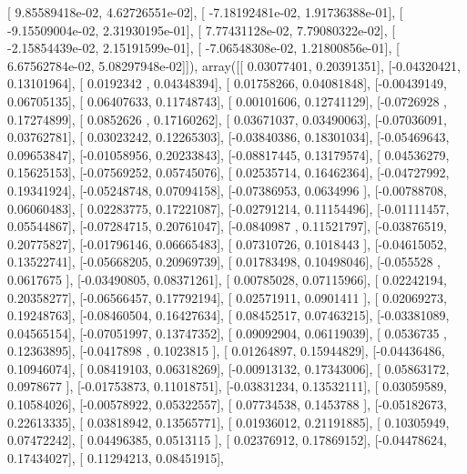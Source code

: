 \documentclass{article}
\begin{document}
       [  9.85589418e-02,   4.62726551e-02],
       [ -7.18192481e-02,   1.91736388e-01],
       [ -9.15509004e-02,   2.31930195e-01],
       [  7.77431128e-02,   7.79080322e-02],
       [ -2.15854439e-02,   2.15191599e-01],
       [ -7.06548308e-02,   1.21800856e-01],
       [  6.67562784e-02,   5.08297948e-02]]), array([[ 0.03077401,  0.20391351],
       [-0.04320421,  0.13101964],
       [ 0.0192342 ,  0.04348394],
       [ 0.01758266,  0.04081848],
       [-0.00439149,  0.06705135],
       [ 0.06407633,  0.11748743],
       [ 0.00101606,  0.12741129],
       [-0.0726928 ,  0.17274899],
       [ 0.0852626 ,  0.17160262],
       [ 0.03671037,  0.03490063],
       [-0.07036091,  0.03762781],
       [ 0.03023242,  0.12265303],
       [-0.03840386,  0.18301034],
       [-0.05469643,  0.09653847],
       [-0.01058956,  0.20233843],
       [-0.08817445,  0.13179574],
       [ 0.04536279,  0.15625153],
       [-0.07569252,  0.05745076],
       [ 0.02535714,  0.16462364],
       [-0.04727992,  0.19341924],
       [-0.05248748,  0.07094158],
       [-0.07386953,  0.0634996 ],
       [-0.00788708,  0.06060483],
       [ 0.02283775,  0.17221087],
       [-0.02791214,  0.11154496],
       [-0.01111457,  0.05544867],
       [-0.07284715,  0.20761047],
       [-0.0840987 ,  0.11521797],
       [-0.03876519,  0.20775827],
       [-0.01796146,  0.06665483],
       [ 0.07310726,  0.1018443 ],
       [-0.04615052,  0.13522741],
       [-0.05668205,  0.20969739],
       [ 0.01783498,  0.10498046],
       [-0.055528  ,  0.0617675 ],
       [-0.03490805,  0.08371261],
       [ 0.00785028,  0.07115966],
       [ 0.02242194,  0.20358277],
       [-0.06566457,  0.17792194],
       [ 0.02571911,  0.0901411 ],
       [ 0.02069273,  0.19248763],
       [-0.08460504,  0.16427634],
       [ 0.08452517,  0.07463215],
       [-0.03381089,  0.04565154],
       [-0.07051997,  0.13747352],
       [ 0.09092904,  0.06119039],
       [ 0.0536735 ,  0.12363895],
       [-0.0417898 ,  0.1023815 ],
       [ 0.01264897,  0.15944829],
       [-0.04436486,  0.10946074],
       [ 0.08419103,  0.06318269],
       [-0.00913132,  0.17343006],
       [ 0.05863172,  0.0978677 ],
       [-0.01753873,  0.11018751],
       [-0.03831234,  0.13532111],
       [ 0.03059589,  0.10584026],
       [-0.00578922,  0.05322557],
       [ 0.07734538,  0.1453788 ],
       [-0.05182673,  0.22613335],
       [ 0.03818942,  0.13565771],
       [ 0.01936012,  0.21191885],
       [ 0.10305949,  0.07472242],
       [ 0.04496385,  0.0513115 ],
       [ 0.02376912,  0.17869152],
       [-0.04478624,  0.17434027],
       [ 0.11294213,  0.08451915],
\end{document}
